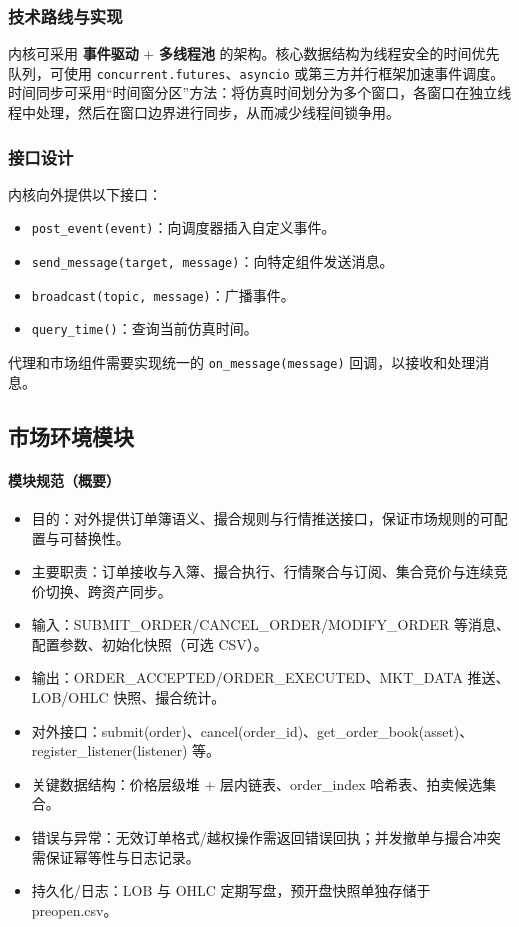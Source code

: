 \subsubsection{技术路线与实现}
内核可采用 \textbf{事件驱动} + \textbf{多线程池} 的架构。核心数据结构为线程安全的时间优先队列，可使用 \verb|concurrent.futures|、\verb|asyncio| 或第三方并行框架加速事件调度。时间同步可采用“时间窗分区”方法：将仿真时间划分为多个窗口，各窗口在独立线程中处理，然后在窗口边界进行同步，从而减少线程间锁争用。

\subsubsection{接口设计}
内核向外提供以下接口：
\begin{itemize}
  \item \verb|post_event(event)|：向调度器插入自定义事件。
  \item \verb|send_message(target, message)|：向特定组件发送消息。
  \item \verb|broadcast(topic, message)|：广播事件。
  \item \verb|query_time()|：查询当前仿真时间。
\end{itemize}
代理和市场组件需要实现统一的 \verb|on_message(message)| 回调，以接收和处理消息。

\subsection{市场环境模块}

\paragraph{模块规范（概要）}
\begin{itemize}
  \item 目的：对外提供订单簿语义、撮合规则与行情推送接口，保证市场规则的可配置与可替换性。
  \item 主要职责：订单接收与入簿、撮合执行、行情聚合与订阅、集合竞价与连续竞价切换、跨资产同步。
  \item 输入：SUBMIT\_ORDER/CANCEL\_ORDER/MODIFY\_ORDER 等消息、配置参数、初始化快照（可选 CSV）。
  \item 输出：ORDER\_ACCEPTED/ORDER\_EXECUTED、MKT\_DATA 推送、LOB/OHLC 快照、撮合统计。
  \item 对外接口：submit(order)、cancel(order\_id)、get\_order\_book(asset)、register\_listener(listener) 等。
  \item 关键数据结构：价格层级堆 + 层内链表、order\_index 哈希表、拍卖候选集合。
  \item 错误与异常：无效订单格式/越权操作需返回错误回执；并发撤单与撮合冲突需保证幂等性与日志记录。
  \item 持久化/日志：LOB 与 OHLC 定期写盘，预开盘快照单独存储于 preopen.csv。
\end{itemize}

